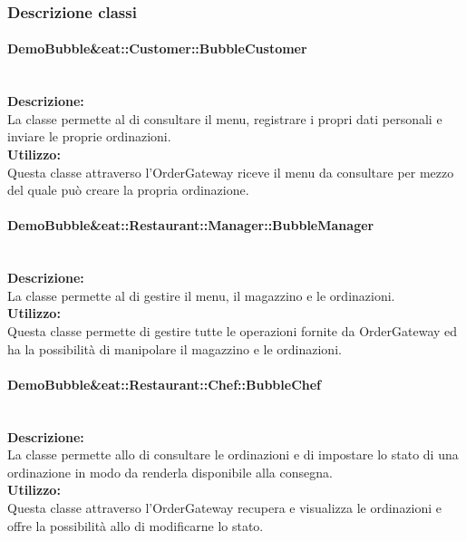 \subsubsection{Descrizione classi}

\paragraph{DemoBubble\&eat\-::Customer\-::Bubble\-Customer}\label{eat-customer}\mbox{}\\
\textbf{Descrizione:}\\
La classe permette al \Customer{} di consultare il menu, registrare i propri dati personali e inviare le proprie ordinazioni.\\
\textbf{Utilizzo:}\\
Questa classe attraverso l'Order\-Gateway riceve il menu da consultare per mezzo del quale può creare la propria ordinazione.\\

\paragraph{Demo\-Bubble\&eat\-::Restaurant\-::Manager\-::Bubble\-Manager}\label{eat-manager}\mbox{}\\
\textbf{Descrizione:}\\
La classe permette al \Manager{} di gestire il menu, il magazzino e le ordinazioni.\\
\textbf{Utilizzo:}\\
Questa classe permette di gestire tutte le operazioni fornite da Order\-Gateway ed ha la possibilità di manipolare il magazzino e le ordinazioni.\\

\paragraph{Demo\-Bubble\&eat\-::Restaurant\-::Chef\-::Bubble\-Chef}\label{eat-chef}\mbox{}\\
\textbf{Descrizione:}\\
La classe permette allo \Chef{} di consultare le ordinazioni e di impostare lo stato di una ordinazione in modo da renderla disponibile alla consegna.\\
\textbf{Utilizzo:}\\
Questa classe attraverso l'Order\-Gateway recupera e visualizza le ordinazioni e offre la possibilità allo \Chef{} di modificarne lo stato.\\

